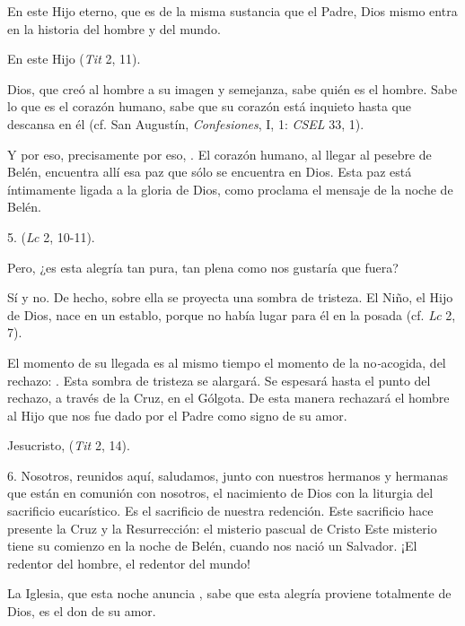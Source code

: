 \begin{body}
\begin{body}
		En este Hijo eterno, que es de la misma sustancia que el Padre, Dios mismo entra en la historia del hombre y del mundo.
		
		En este Hijo  (\emph{Tit} 2, 11).
		
		Dios, que creó al hombre a su imagen y semejanza, sabe quién es el hombre. Sabe lo que es el corazón humano, sabe que su corazón está inquieto hasta que descansa en él (cf. San Augustín, \emph{Confesiones}, I, 1: \emph{CSEL} 33, 1).
		
		Y por eso, precisamente por eso, . El corazón humano, al llegar al pesebre de Belén, encuentra allí esa paz que sólo se encuentra en Dios. Esta paz está íntimamente ligada a la gloria de Dios, como proclama el mensaje de la noche de Belén.
		
		5.  (\emph{Lc} 2, 10-11).
		
		Pero, ¿es esta alegría tan pura, tan plena como nos gustaría que fuera?
		
		Sí y no. De hecho, sobre ella se proyecta una sombra de tristeza. El Niño, el Hijo de Dios, nace en un establo, porque no había lugar para él en la posada (cf. \emph{Lc} 2, 7).
		
		El momento de su llegada es al mismo tiempo el momento de la no\emph{-}acogida, del rechazo: . Esta sombra de tristeza se alargará. Se espesará hasta el punto del rechazo, a través de la Cruz, en el Gólgota. De esta manera rechazará el hombre al Hijo que nos fue dado por el Padre como signo de su amor.
		
		Jesucristo,  (\emph{Tit} 2, 14).
		
		6. Nosotros, reunidos aquí, saludamos, junto con nuestros hermanos y hermanas que están en comunión con nosotros, el nacimiento de Dios con la liturgia del sacrificio eucarístico. Es el sacrificio de nuestra redención. Este sacrificio hace presente la Cruz y la Resurrección: el misterio pascual de Cristo Este misterio tiene su comienzo en la noche de Belén, cuando nos nació un Salvador. ¡El redentor del hombre, el redentor del mundo!
		
		La Iglesia, que esta noche anuncia , sabe que esta alegría proviene totalmente de Dios, es el don de su amor.
		

\end{body}
\end{body}
